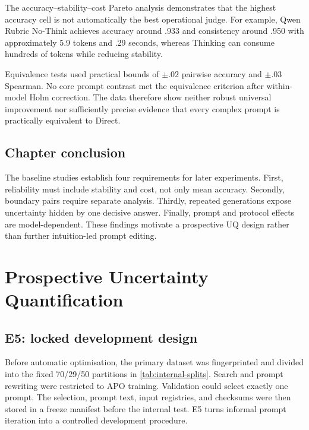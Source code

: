 \documentclass[11pt,twoside,a4paper]{report}
\begin{document}
The accuracy--stability--cost Pareto analysis demonstrates that the highest accuracy
cell is not automatically the best operational judge.  For example, Qwen Rubric
No-Think achieves accuracy around .933 and consistency around .950 with approximately
5.9 tokens and .29 seconds, whereas Thinking can consume hundreds of tokens while
reducing stability.

Equivalence tests used practical bounds of $\pm.02$ pairwise accuracy and $\pm.03$
Spearman.  No core prompt contrast met the equivalence criterion after within-model
Holm correction.  The data therefore show neither robust universal improvement nor
sufficiently precise evidence that every complex prompt is practically equivalent
to Direct.

\section{Chapter conclusion}

The baseline studies establish four requirements for later experiments.  First,
reliability must include stability and cost, not only mean accuracy.  Secondly,
boundary pairs require separate analysis.  Thirdly, repeated generations expose
uncertainty hidden by one decisive answer.  Finally, prompt and protocol effects are
model-dependent.  These findings motivate a prospective UQ design rather than
further intuition-led prompt editing.

\chapter{Prospective Uncertainty Quantification}
\label{chap:uq}

\section{E5: locked development design}

Before automatic optimisation, the primary dataset was fingerprinted and divided
into the fixed 70/29/50 partitions in \cref{tab:internal-splits}.  Search and prompt
rewriting were restricted to APO training.  Validation could select exactly one
prompt.  The selection, prompt text, input registries, and checksums were then stored
in a freeze manifest before the internal test.  E5 turns informal prompt iteration
into a controlled development procedure.
\end{document}
